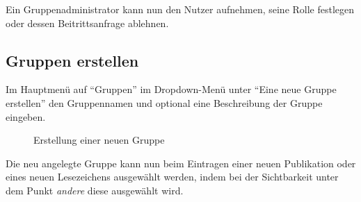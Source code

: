 Ein Gruppenadministrator kann nun den Nutzer aufnehmen, seine Rolle festlegen oder dessen Beitrittsanfrage ablehnen.
\subsection{Gruppen erstellen}
\label{subsec:gruppenErstellen}

Im Hauptmenü auf \enquote{Gruppen} im Dropdown-Menü unter \enquote{Eine neue Gruppe erstellen} den Gruppennamen und optional eine Beschreibung der Gruppe eingeben.


\begin{figure}[h!]
 \centering
 \caption{Erstellung einer neuen Gruppe}
 \label{fig:erstellungNeueGruppe}
\end{figure}

Die neu angelegte Gruppe kann nun beim Eintragen einer neuen Publikation oder eines neuen Lesezeichens ausgewählt werden, indem bei der Sichtbarkeit unter dem Punkt \textit{andere} diese ausgewählt wird.
